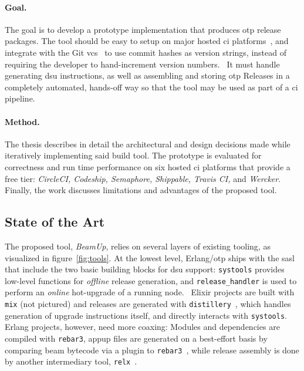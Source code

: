 \paragraph{Goal.} The goal is to develop a prototype implementation that produces \acrshort{otp} release packages. The tool should be easy to setup on major hosted \acrfull{ci} platforms~\cite{dig2016usage}, and integrate with the Git \acrfull{vcs}~\cite{sink2011version} to use commit hashes as version strings, instead of requiring the developer to hand-increment version numbers.~\cite{maste2016} It must handle generating \acrshort{dsu} instructions, as well as assembling and storing \acrshort{otp} Releases in a completely automated, hands-off way so that the tool may be used as part of a \acrshort{ci} pipeline.

\paragraph{Method.} The thesis describes in detail the architectural and design decisions made while iteratively implementing said build tool. The prototype is evaluated for correctness and run time performance on six hosted \acrshort{ci} platforms that provide a free tier: \emph{CircleCI, Codeship, Semaphore, Shippable, Travis CI,} and \emph{Wercker}. Finally, the work discusses limitations and advantages of the proposed tool.

\cleardoublepage
\subsection{State of the Art}\label{sec:sota}

The proposed tool, \emph{BeamUp}, relies on several layers of existing tooling, as visualized in figure~\ref{fig:tools}. At the lowest level, Erlang/\acrshort{otp} ships with the \acrfull{sasl} that include the two basic building blocks for \acrshort{dsu} support: \lstinline|systools| provides low-level functions for \emph{offline} release generation, and \lstinline|release_handler| is used to perform an \emph{online} hot-upgrade of a running node.~\cite{doc:otp}
Elixir projects are built with \lstinline|mix| (not pictured) and releases are generated with \lstinline|distillery|~\cite{distillery}, which handles generation of upgrade instructions itself, and directly interacts with \lstinline|systools|. Erlang projects, however, need more coaxing: Modules and dependencies are compiled with \lstinline|rebar3|, \acrfull{appup} files are generated on a best-effort basis by comparing \acrshort{beam} bytecode via a plugin to \lstinline|rebar3|~\cite{rebar3appup}, while release assembly is done by another intermediary tool, \lstinline|relx|~\cite{loder2016production}.

